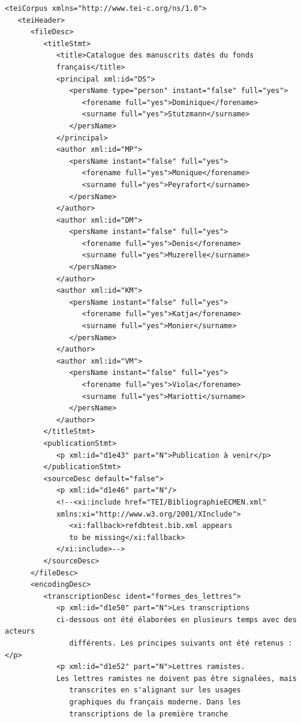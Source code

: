 \documentclass[a4paper,12pt,twoside]{book}
\begin{document}
	\begin{verbatim}
<teiCorpus xmlns="http://www.tei-c.org/ns/1.0">
   <teiHeader>
      <fileDesc>
         <titleStmt>
            <title>Catalogue des manuscrits datés du fonds 
            français</title>
            <principal xml:id="DS">
               <persName type="person" instant="false" full="yes">
                  <forename full="yes">Dominique</forename>
                  <surname full="yes">Stutzmann</surname>
               </persName>
            </principal>
            <author xml:id="MP">
               <persName instant="false" full="yes">
                  <forename full="yes">Monique</forename>
                  <surname full="yes">Peyrafort</surname>
               </persName>
            </author>
            <author xml:id="DM">
               <persName instant="false" full="yes">
                  <forename full="yes">Denis</forename>
                  <surname full="yes">Muzerelle</surname>
               </persName>
            </author>
            <author xml:id="KM">
               <persName instant="false" full="yes">
                  <forename full="yes">Katja</forename>
                  <surname full="yes">Monier</surname>
               </persName>
            </author>
            <author xml:id="VM">
               <persName instant="false" full="yes">
                  <forename full="yes">Viola</forename>
                  <surname full="yes">Mariotti</surname>
               </persName>
            </author>
         </titleStmt>
         <publicationStmt>
            <p xml:id="d1e43" part="N">Publication à venir</p>
         </publicationStmt>
         <sourceDesc default="false">
            <p xml:id="d1e46" part="N"/>
            <!--<xi:include href="TEI/BibliographieECMEN.xml" 
            xmlns:xi="http://www.w3.org/2001/XInclude">
               <xi:fallback>refdbtest.bib.xml appears 
               to be missing</xi:fallback>
            </xi:include>-->
         </sourceDesc>
      </fileDesc>
      <encodingDesc>
         <transcriptionDesc ident="formes_des_lettres">
            <p xml:id="d1e50" part="N">Les transcriptions
            ci-dessous ont été élaborées en plusieurs temps avec des acteurs
               différents. Les principes suivants ont été retenus :</p>
            <p xml:id="d1e52" part="N">Lettres ramistes. 
            Les lettres ramistes ne doivent pas être signalées, mais
               transcrites en s'alignant sur les usages 
               graphiques du français moderne. Dans les
               transcriptions de la première tranche 

\end{verbatim}
\end{document}
